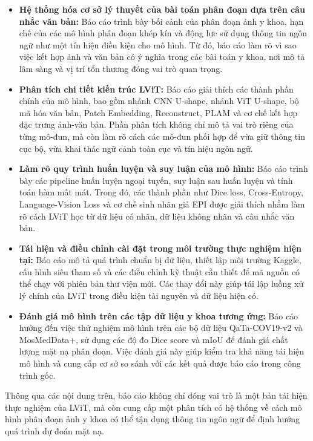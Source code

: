 \begin{itemize}
    \item \textbf{Hệ thống hóa cơ sở lý thuyết của bài toán phân đoạn dựa trên câu nhắc văn bản:} Báo cáo trình bày bối cảnh của phân đoạn ảnh y khoa, hạn chế của các mô hình phân đoạn khép kín và động lực sử dụng thông tin ngôn ngữ như một tín hiệu điều kiện cho mô hình. Từ đó, báo cáo làm rõ vì sao việc kết hợp ảnh và văn bản có ý nghĩa trong các bài toán y khoa, nơi mô tả lâm sàng và vị trí tổn thương đóng vai trò quan trọng.

    \item \textbf{Phân tích chi tiết kiến trúc LViT:} Báo cáo giải thích các thành phần chính của mô hình, bao gồm nhánh CNN U-shape, nhánh ViT U-shape, bộ mã hóa văn bản, Patch Embedding, Reconstruct, PLAM và cơ chế kết hợp đặc trưng ảnh-văn bản. Phần phân tích không chỉ mô tả vai trò riêng của từng mô-đun, mà còn làm rõ cách các mô-đun phối hợp để vừa giữ thông tin cục bộ, vừa khai thác ngữ cảnh toàn cục và tín hiệu ngôn ngữ.

    \item \textbf{Làm rõ quy trình huấn luyện và suy luận của mô hình:} Báo cáo trình bày các pipeline huấn luyện ngoại tuyến, suy luận sau huấn luyện và tính toán hàm mất mát. Trong đó, các thành phần như Dice loss, Cross-Entropy, Language-Vision Loss và cơ chế sinh nhãn giả EPI được giải thích nhằm làm rõ cách LViT học từ dữ liệu có nhãn, dữ liệu không nhãn và câu nhắc văn bản.

    \item \textbf{Tái hiện và điều chỉnh cài đặt trong môi trường thực nghiệm hiện tại:} Báo cáo mô tả quá trình chuẩn bị dữ liệu, thiết lập môi trường Kaggle, cấu hình siêu tham số và các điều chỉnh kỹ thuật cần thiết để mã nguồn có thể chạy với phiên bản thư viện mới. Các thay đổi này giúp tái lập luồng xử lý chính của LViT trong điều kiện tài nguyên và dữ liệu hiện có.

    \item \textbf{Đánh giá mô hình trên các tập dữ liệu y khoa tương ứng:} Báo cáo hướng đến việc thử nghiệm mô hình trên các bộ dữ liệu QaTa-COV19-v2 và MosMedData+, sử dụng các độ đo Dice score và mIoU để đánh giá chất lượng mặt nạ phân đoạn. Việc đánh giá này giúp kiểm tra khả năng tái hiện mô hình và cung cấp cơ sở so sánh với các kết quả được báo cáo trong công trình gốc.
\end{itemize}

Thông qua các nội dung trên, báo cáo không chỉ đóng vai trò là một bản tái hiện thực nghiệm của LViT, mà còn cung cấp một phân tích có hệ thống về cách mô hình phân đoạn ảnh y khoa có thể tận dụng thông tin ngôn ngữ để định hướng quá trình dự đoán mặt nạ.

